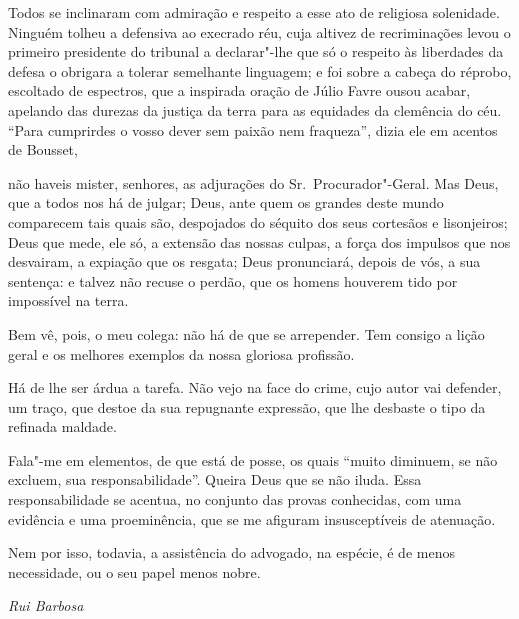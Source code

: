 Todos se inclinaram com admiração e respeito a esse ato
de religiosa solenidade. Ninguém tolheu a defensiva ao execrado réu,
cuja altivez de recriminações levou o primeiro presidente do tribunal a
declarar"-lhe que só o respeito às liberdades da defesa o obrigara a
tolerar semelhante linguagem; e foi sobre a cabeça do réprobo, 
escoltado de espectros, que a inspirada oração de Júlio Favre ousou
acabar, apelando das durezas da justiça da terra para as equidades da
clemência do céu. “Para cumprirdes o vosso dever sem paixão nem
fraqueza”, dizia ele em acentos de Bousset, 

\begin{hedraquote}
não haveis mister,
senhores, as adjurações do Sr.~Procurador"-Geral. Mas Deus, que a todos
nos há de julgar; Deus, ante quem os grandes deste mundo comparecem
tais quais são, despojados do séquito dos seus cortesãos e lisonjeiros;
Deus que mede, ele só, a extensão das nossas culpas, a força dos
impulsos que nos desvairam, a expiação que os resgata; Deus
pronunciará, depois de vós, a sua sentença: e talvez não recuse o
perdão, que os homens houverem tido por impossível na terra. 
\end{hedraquote}

Bem vê, pois, o meu colega: não há de que se arrepender. Tem consigo a lição
geral e os melhores exemplos da nossa gloriosa profissão. 

Há de lhe ser árdua a tarefa. Não vejo na face do crime, cujo autor vai defender,
um traço, que destoe da sua repugnante expressão, que lhe desbaste o
tipo da refinada maldade. 

Fala"-me em elementos, de que está de posse,
os quais “muito diminuem, se não excluem, sua responsabilidade”. Queira
Deus que se não iluda. Essa responsabilidade se acentua, no conjunto
das provas conhecidas, com uma evidência e uma proeminência, que se me
afiguram insusceptíveis de atenuação. 

Nem por isso, todavia, a assistência do advogado, na espécie, 
é de menos necessidade, ou o seu papel menos nobre. 
\bigskip

\hfill\textit{Rui Barbosa} 

\clearpage
